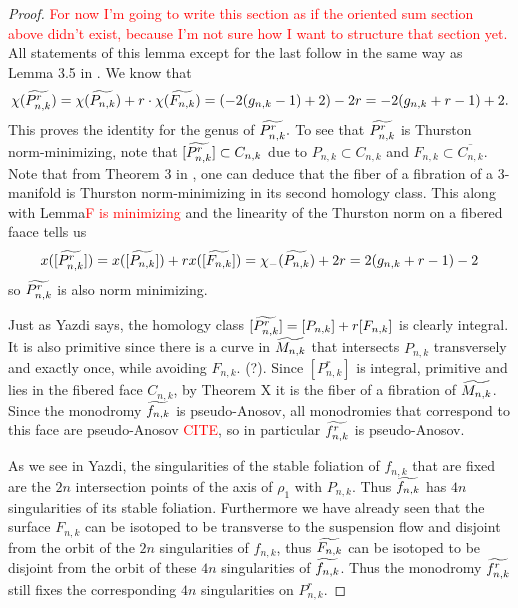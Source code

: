 \begin{proof}
    \textcolor{red}{For now I'm going to write this section as if the oriented sum section above didn't exist, because I'm not sure how I want to structure that section yet.}
    All statements of this lemma except for the last follow in the same way as Lemma 3.5 in \cite{yazdi2018pseudo}. We know that
    $$\chi(\widetilde{P^r_{n,k}}) = \chi(\widetilde{P_{n,k}}) + r\cdot\chi(\widetilde{F_{n,k}}) = (-2(g_{n,k} - 1) + 2)-2r = -2(g_{n,k} + r - 1) + 2.$$ This proves the identity for the genus of $\widetilde{P^r_{n,k}}.$ To see that $\widetilde{P^r_{n,k}}$ is Thurston norm-minimizing, note that $[\widetilde{P^r_{n,k}}] \subset C_{n,k}$ due to $P_{n,k} \subset C_{n,k}$ and $F_{n,k} \subset \overline{C_{n,k}}$. Note that from Theorem 3 in \cite{thurston1986norm}, one can deduce that the fiber of a fibration of a 3-manifold is Thurston norm-minimizing in its second homology class. This along with Lemma\textcolor{red}{F is minimizing} and the linearity of the Thurston norm on a fibered faace tells us
    $$x([\widetilde{P^r_{n,k}}]) = x([\widetilde{P_{n,k}}]) + rx([\widetilde{F_{n,k}}]) = \chi_-(\widetilde{P_{n,k}}) + 2r = 2(g_{n,k} + r - 1) - 2$$ so $\widetilde{P^r_{n,k}}$ is also norm minimizing.

    Just as Yazdi says, the homology class $[\widetilde{P^r_{n,k}}] = [P_{n,k}] + r[F_{n,k}]$ is clearly integral. It is also primitive since there is a curve in $\widetilde{M_{n,k}}$ that intersects $P_{n,k}$ transversely and exactly once, while avoiding $F_{n,k}$. (?). Since $[P^r_{n,k}]$ is integral, primitive and lies in the fibered face $C_{n,k}$, by Theorem X it is the fiber of a fibration of $\widetilde{M_{n,k}}$. Since the monodromy $\widetilde{f_{n,k}}$ is pseudo-Anosov, all monodromies that correspond to this face are pseudo-Anosov \textcolor{red}{CITE}, so in particular $\widetilde{f^r_{n,k}}$ is pseudo-Anosov.

    As we see in Yazdi, the singularities of the stable foliation of $f_{n,k}$ that are fixed are the $2n$ intersection points of the axis of $\rho_1$ with $P_{n,k}$. Thus $\widetilde{f_{n,k}}$ has $4n$ singularities of its stable foliation. Furthermore we have already seen that the surface $F_{n,k}$ can be isotoped to be transverse to the suspension flow and disjoint from the orbit of the $2n$ singularities of $f_{n,k}$, thus $\widetilde{F_{n,k}}$ can be isotoped to be disjoint from the orbit of these $4n$ singularities of $\widetilde{f_{n,k}}$. Thus the monodromy $\widetilde{f^r_{n,k}}$ still fixes the corresponding $4n$ singularities on $P^r_{n,k}$.


\end{proof}
